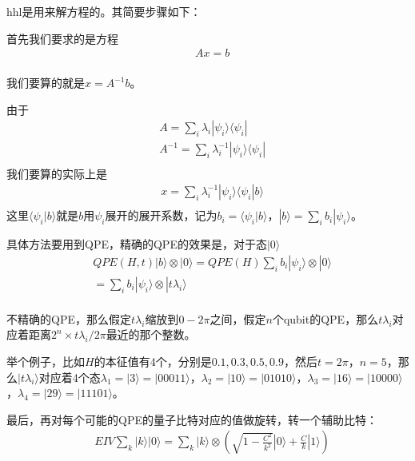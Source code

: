hhl是用来解方程的。其简要步骤如下：

首先我们要求的是方程
\begin{equation}
\begin{split}
&Ax=b\\
\end{split}
\end{equation}

我们要算的就是$x=A^{-1}b$。

由于
\begin{equation}
\begin{split}
&A=\sum _i\lambda _i |\psi _i \rangle \langle \psi _i |\\
&A^{-1}=\sum _i\lambda _i^{-1} |\psi _i \rangle \langle \psi _i |\\
\end{split}
\end{equation}
我们要算的实际上是
\begin{equation}
\begin{split}
&x=\sum _i\lambda _i^{-1} |\psi _i \rangle \langle \psi _i |b\rangle\\
\end{split}
\end{equation}
这里$\langle \psi _i |b\rangle$就是$b$用$\psi _i$展开的展开系数，记为$b_i=\langle \psi _i |b\rangle$，$|b\rangle = \sum _i b_i |\psi _i\rangle$。

具体方法要用到QPE，精确的QPE的效果是，对于态$|0 \rangle$
\begin{equation}
\begin{split}
&QPE(H,t) |b\rangle \otimes |0 \rangle = QPE(H) \sum _i b_i |\psi _i\rangle \otimes |0 \rangle \\
&=\sum _i b_i |\psi _i\rangle \otimes | t\lambda _i \rangle \\
\end{split}
\end{equation}

不精确的QPE，那么假定$t\lambda _i$缩放到$0 - 2\pi$之间，假定$n$个qubit的QPE，那么$t\lambda _i$对应着距离$2^n \times t\lambda _i / 2\pi$最近的那个整数。

举个例子，比如$H$的本征值有4个，分别是$0.1, 0.3, 0.5, 0.9$，然后$t=2\pi$，$n=5$，那么$ |t\lambda _i \rangle$对应着4个态$\lambda _1 =|3\rangle= |00011\rangle$，$\lambda _2 = |10\rangle=|01010\rangle$，$\lambda _3 =|16\rangle= |10000\rangle$，$\lambda _4 = |29\rangle = |11101\rangle$。

最后，再对每个可能的QPE的量子比特对应的值做旋转，转一个辅助比特：
\begin{equation}
\begin{split}
&EIV \sum _k  | k \rangle |0\rangle = \sum _k  | k \rangle \otimes \left(\sqrt{1-\frac{C^2}{k^2}}|0\rangle + \frac{C}{k}|1\rangle\right)\\
\end{split}
\end{equation}

